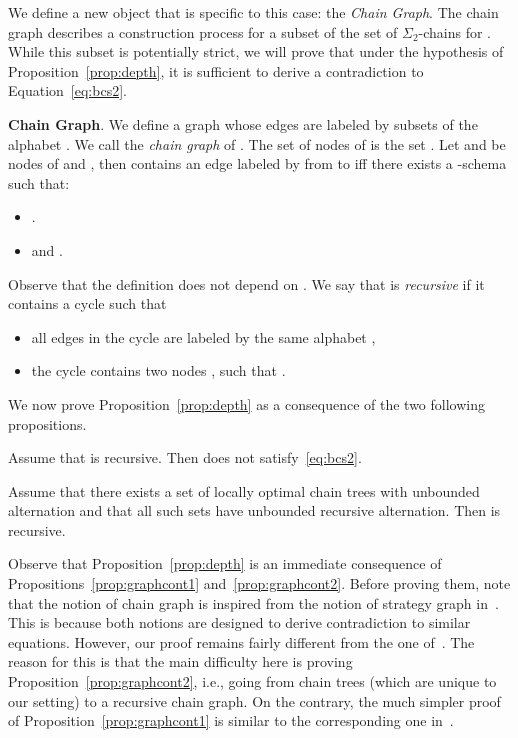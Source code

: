 \documentclass[envcountsame]{llncs}
\newcommand{\sic}[1]{\ensuremath{\Sigma_{#1}}\xspace}
\newcommand\chain{chain\xspace}
\newcommand\qchains[1]{\ensuremath{\sic{#1}}-chains\xspace}
\newcommand\Chain{Chain\xspace}
\newcommand\dchains{\qchains{2}}
\begin{document}
We define a new object that is specific to this case: the \emph{\Chain
  Graph}. The \chain graph describes a construction process for a subset
of the set of \dchains for . While this subset is potentially
strict, we will prove that under the hypothesis of
Proposition~\ref{prop:depth}, it is sufficient to derive a
contradiction to Equation~\eqref{eq:bcs2}.

\medskip
\noindent
{\bf \Chain Graph}. We define a graph  whose edges
are labeled by subsets of the alphabet . We call  the
\emph{\chain graph} of . The set  of nodes of 
is the set . Let  and  be
nodes of  and , then  contains an edge
labeled by  from  to  iff there exists a
-schema  such that:

\begin{itemize}
\item .
\item  and .
\end{itemize} 

Observe that the definition does not depend on . We say that
 is \emph{recursive} if it contains a cycle such that
\begin{itemize}
\item [] all edges in the cycle are labeled by the same alphabet ,
\item [] the cycle contains two nodes , 
  such that .
\end{itemize}
We now prove
Proposition~\ref{prop:depth} as a consequence of the two following 
propositions.

\begin{proposition} \label{prop:graphcont1}
  Assume that  is recursive. Then  does not
  satisfy~\eqref{eq:bcs2}.
\end{proposition}

\begin{proposition} \label{prop:graphcont2}
  Assume that there exists a set of locally optimal \chain
  trees  with unbounded alternation and that
  all such sets have unbounded recursive alternation. Then 
  is recursive.
\end{proposition}

Observe that Proposition~\ref{prop:depth} is an immediate consequence of
Propositions~\ref{prop:graphcont1} and~\ref{prop:graphcont2}. Before proving
them, note that the notion of \chain graph is inspired from the notion of
strategy graph in~\cite{bpopen}. This is because both notions are designed to
derive contradiction to similar equations. However, our proof remains fairly
different from the one of~\cite{bpopen}. The reason for this is that the main
difficulty here is proving Proposition~\ref{prop:graphcont2}, i.e., going from
\chain trees (which are unique to our setting) to a recursive \chain graph. On
the contrary, the much simpler proof of Proposition~\ref{prop:graphcont1} is
similar to the corresponding one in~\cite{bpopen}.
\end{document}
